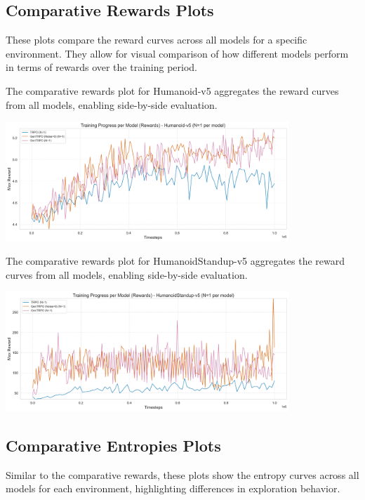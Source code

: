 \documentclass{svproc}
\begin{document}
\subsection{Comparative Rewards Plots}
These plots compare the reward curves across all models for a specific environment. They allow for visual comparison of how different models perform in terms of rewards over the training period.

The comparative rewards plot for Humanoid-v5 aggregates the reward curves from all models, enabling side-by-side evaluation.

\begin{center}
\includegraphics[width=0.8\textwidth]{graph_Humanoid-v5_models_rewards.png}
\end{center}

The comparative rewards plot for HumanoidStandup-v5 aggregates the reward curves from all models, enabling side-by-side evaluation.

\begin{center}
\includegraphics[width=0.8\textwidth]{graph_HumanoidStandup-v5_models_rewards.png}
\end{center}

\subsection{Comparative Entropies Plots}
Similar to the comparative rewards, these plots show the entropy curves across all models for each environment, highlighting differences in exploration behavior.
\end{document}

